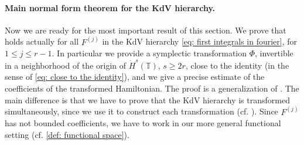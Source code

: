 \documentclass[a4paper,10pt,reqno]{article}
\theoremstyle{definition}
\theoremstyle{plain}
\theoremstyle{plain}
\theoremstyle{definition}
\theoremstyle{plain}
\theoremstyle{plain}
\theoremstyle{plain}
\theoremstyle{definition}
\theoremstyle{definition}
\def \T{\mathbb{T}}
\def \k{\bm{k}}
\begin{document}


\paragraph{Main normal form theorem for the KdV hierarchy.}
Now we are ready for the most important result of this section. 
We prove that  holds actually for all $F^{(j)}$ in the KdV hierarchy \eqref{eq: first integrals in fourier}, for $1 \le j \le r-1$.
In particular we provide a symplectic transformation $\Phi$, invertible in a neighborhood of the origin of $\dot{H}^s(\T)$, $s \ge 2r$, close to the identity (in the sense of \eqref{eq: close to the identity}), and we give a precise estimate of the coefficients of the transformed Hamiltonian.
The proof is a generalization of \cite[Proposition 3.10, Theorem 2]{bernier}.
The main difference is that we have to prove that the KdV hierarchy is transformed simultaneously, since we use it to construct each transformation (cf. ).
Since $F^{(j)}$ has not bounded coefficients, we have to work in our more general functional setting (cf. \eqref{def: functional space}).
\end{document}
